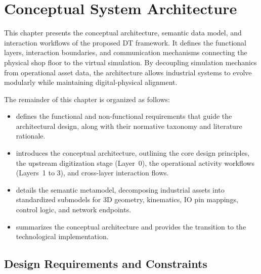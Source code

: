 
%

\chapter{Conceptual System Architecture}
\label{cha:architecture}

This chapter presents the conceptual architecture, semantic data model, and interaction workflows of the proposed \gls{DT} framework. It defines the functional layers, interaction boundaries, and communication mechanisms connecting the physical shop floor to the virtual simulation. By decoupling simulation mechanics from operational asset data, the architecture allows industrial systems to evolve modularly while maintaining digital-physical alignment.

The remainder of this chapter is organized as follows:
\begin{itemize}
    \item {} defines the functional and non-functional requirements that guide the architectural design, along with their normative taxonomy and literature rationale.
    \item {} introduces the conceptual architecture, outlining the core design principles, the upstream digitization stage (Layer~0), the operational activity workflows (Layers~1 to 3), and cross-layer interaction flows.
    \item {} details the semantic metamodel, decomposing industrial assets into standardized submodels for 3D geometry, kinematics, \gls{IO} pin mappings, control logic, and network endpoints.
    \item {} summarizes the conceptual architecture and provides the transition to the technological implementation.
\end{itemize}

\section{Design Requirements and Constraints}
\label{sec:design_requirements}

